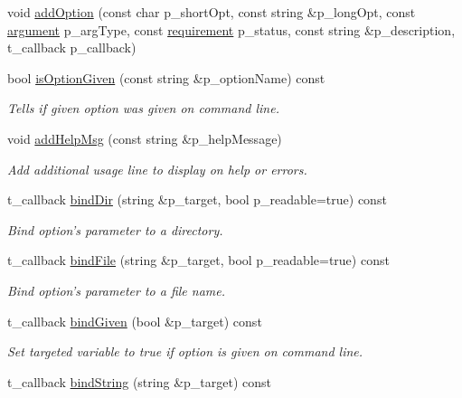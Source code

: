 \begin{DoxyCompactItemize}
void \hyperlink{classxtd_1_1Application_a7cea42a03984ceed3bae129ff9e1ef54}{add\-Option} (const char p\-\_\-short\-Opt, const string \&p\-\_\-long\-Opt, const \hyperlink{classxtd_1_1Application_a672c075ed901e463609077d571a714c7}{argument} p\-\_\-arg\-Type, const \hyperlink{classxtd_1_1Application_a49c0397e9fd22067e3a536443a17fe24}{requirement} p\-\_\-status, const string \&p\-\_\-description, t\-\_\-callback p\-\_\-callback)
\item 
bool \hyperlink{classxtd_1_1Application_a4aca412c4a0bcd761e28b0350bd71578}{is\-Option\-Given} (const string \&p\-\_\-option\-Name) const 
\begin{DoxyCompactList}\small\item\em Tells if given option was given on command line. \end{DoxyCompactList}\item 
void \hyperlink{classxtd_1_1Application_abdfaafd220104a063c344a4f7e126ec0}{add\-Help\-Msg} (const string \&p\-\_\-help\-Message)
\begin{DoxyCompactList}\small\item\em Add additional usage line to display on help or errors. \end{DoxyCompactList}\item 
t\-\_\-callback \hyperlink{classxtd_1_1Application_a2b491ba745bbd3b2d01d9e623c0aff60}{bind\-Dir} (string \&p\-\_\-target, bool p\-\_\-readable=true) const 
\begin{DoxyCompactList}\small\item\em Bind option's parameter to a directory. \end{DoxyCompactList}\item 
t\-\_\-callback \hyperlink{classxtd_1_1Application_ab10f6dde0bf4034dff7eafe8a45c2029}{bind\-File} (string \&p\-\_\-target, bool p\-\_\-readable=true) const 
\begin{DoxyCompactList}\small\item\em Bind option's parameter to a file name. \end{DoxyCompactList}\item 
t\-\_\-callback \hyperlink{classxtd_1_1Application_a59b986c85c2e1d9473f73df10425dfcf}{bind\-Given} (bool \&p\-\_\-target) const 
\begin{DoxyCompactList}\small\item\em Set targeted variable to true if option is given on command line. \end{DoxyCompactList}\item 
t\-\_\-callback \hyperlink{classxtd_1_1Application_a36a351db3830e2e894a39fbd42842280}{bind\-String} (string \&p\-\_\-target) const 

\end{DoxyCompactItemize}
